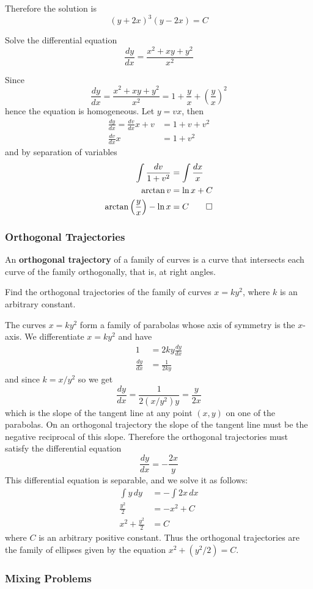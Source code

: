 Therefore the solution is
\[(y+2x)^3(y-2x)=C\]
\begin{problem}
    Solve the differential equation
    \[\frac{dy}{dx}=\frac{x^2+xy+y^2}{x^2}\]
\end{problem}
\begin{solution}
    Since
    \[\frac{dy}{dx}=\frac{x^2+xy+y^2}{x^2}
    =1+\frac{y}{x}+\left(\frac{y}{x}\right)^2\]
    hence the equation is homogeneous.
    Let \(y=vx\), then
    \begin{align*}
        \frac{dy}{dx}=\frac{dv}{dx}x+v &= 1+v+v^2 \\
        \frac{dv}{dx}x &= 1+v^2
    \end{align*}
    and by separation of variables
    \begin{align*}
        \int\frac{dv}{1+v^2} &= \int\frac{dx}{x} \\
        \arctan v &= \ln x+C \\
        \arctan\left(\frac{y}{x}\right)-\ln x &= C \qedhere
    \end{align*}
\end{solution}

\subsubsection*{Orthogonal Trajectories}
An \textbf{orthogonal trajectory} of a family of curves is a curve that
intersects each curve of the family orthogonally, that is, at right angles.
\begin{problem}
    Find the orthogonal trajectories of the family of curves \(x=ky^2\), where
    \(k\) is an arbitrary constant.
\end{problem}
\begin{solution}
    The curves \(x=ky^2\) form a family of parabolas whose axis of symmetry is
    the \(x\)-axis.
    We differentiate \(x=ky^2\) and have
    \begin{align*}
        1 &= 2ky\frac{dy}{dx} \\
        \frac{dy}{dx} &= \frac{1}{2ky}
    \end{align*}
    and since \(k=x/y^2\) so we get
    \[\frac{dy}{dx}=\frac{1}{2(x/y^2)y}=\frac{y}{2x}\]
    which is the slope of the tangent line at any point \((x,y)\) on one of
    the parabolas.
    On an orthogonal trajectory the slope of the tangent line must be the
    negative reciprocal of this slope.
    Therefore the orthogonal trajectories must satisfy the differential
    equation
    \[\frac{dy}{dx}=-\frac{2x}{y}\]
    This differential equation is separable, and we solve it as follows:
    \begin{align*}
        \int y\,dy &= -\int 2x\,dx \\
        \frac{y^2}{2} &= -x^2+C \\
        x^2+\frac{y^2}{2} &= C
    \end{align*}
    where \(C\) is an arbitrary positive constant.
    Thus the orthogonal trajectories are the family of ellipses given by the
    equation \(x^2+(y^2/2)=C\).
\end{solution}

\subsubsection*{Mixing Problems}